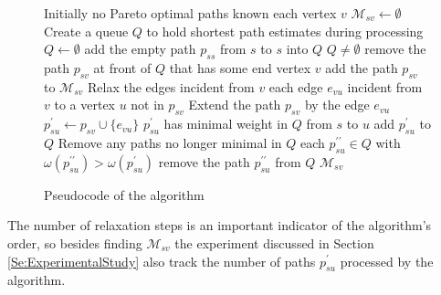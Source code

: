 \documentclass[preprint,authoryear,12pt]{elsarticle}
\begin{document}
\begin{figure}[t]
\begin{small}
\begin{codebox}
\li \Comment Initially no Pareto optimal paths known
\li \For each vertex $v$
\li \Do $\mathcal{M}_{sv} \gets \emptyset$
    \End
\li \Comment Create a queue $Q$ to hold shortest path estimates during processing
\li $Q \gets \emptyset$
\li add the empty path $p_{ss}$ from $s$ to $s$ into $Q$
\li \While $Q \ne \emptyset$
\li \Do remove the path $p_{sv}$ at front of $Q$ that has some end vertex $v$
\li     add the path $p_{sv}$ to $\mathcal{M}_{sv}$
\li     \Comment Relax the edges incident from $v$
\li     \For each edge $e_{vu}$ incident from $v$ to a vertex $u$ not in $p_{sv}$
\li     \Do \Comment Extend the path $p_{sv}$ by the edge $e_{vu}$
\li         $p^\prime_{su} \gets p_{sv}\cup\{e_{vu}\}$
\li         \If $p^\prime_{su}$ has minimal weight in $Q$ from $s$ to $u$
\li         \Then add $p^\prime_{su}$ to $Q$
\li             \Comment Remove any paths no longer minimal in $Q$
\li             \For each $p^{\prime\prime}_{su}\in Q$ with
                   $\omega\left(p^{\prime\prime}_{su}\right)>\omega\left(p^\prime_{su}\right)$
\li             \Do remove the path $p^{\prime\prime}_{su}$ from $Q$
                \End
            \End
        \End
    \End
\li \Return $\mathcal{M}_{sv}$
\end{codebox}
\end{small}
\caption{Pseudocode of the algorithm}
\label{pseudo}
\end{figure}

The number of relaxation steps is an important indicator of the algorithm's
order, so besides finding $\mathcal{M}_{sv}$ the experiment discussed in
Section \ref{Se:ExperimentalStudy} also track the number of paths
$p^\prime_{su}$ processed by the algorithm.
\end{document}
